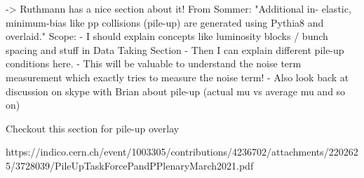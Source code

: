 
->  Ruthmann has a nice section about it!
From Sommer: "Additional in- elastic, minimum-bias like pp collisions (pile-up) are generated using Pythia8 and overlaid."
Scope:
- I should explain concepts like luminosity blocks  / bunch spacing and stuff in Data Taking Section
- Then I can explain different pile-up conditions here.
- This will be valuable to understand the noise term measurement which exactly tries to measure the noise term!
- Also look back at discussion on skype with Brian about pile-up (actual mu vs average mu and so on)

Checkout this section for pile-up overlay

https://indico.cern.ch/event/1003305/contributions/4236702/attachments/2202625/3728039/PileUpTaskForcePandPPlenaryMarch2021.pdf



